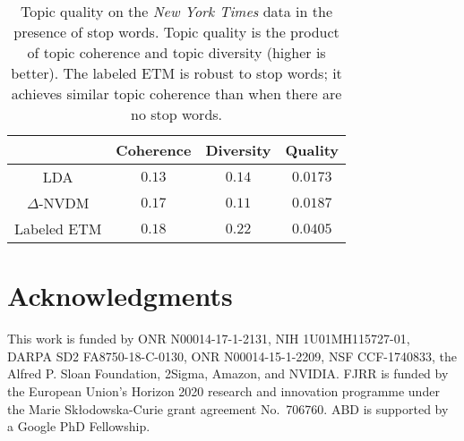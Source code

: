 \documentclass[11pt,a4paper]{article}
\begin{document}
\begin{table}[t]
  \centering
  \caption{Topic quality on the \emph{New York Times} data in the
    presence of stop words. Topic quality is the
    product of topic coherence and topic diversity (higher is
    better). The labeled \gls{ETM} is robust to stop words; it achieves
    similar topic coherence than when there are no stop words.
    \label{tab:tc_td_stopwords}}
  {\small
    \begin{tabular}{cccc} \toprule
      & Coherence  &  Diversity  & Quality\\ \midrule
      \acrshort{LDA}           &  $0.13$ & $0.14$ & $0.0173$  \\
            $\Delta$-\acrshort{NVDM} &   $0.17$        &    $0.11$   & $0.0187$    \\
      Labeled \acrshort{ETM}    & $\mathbf{0.18}$ & $\mathbf{0.22}$ & $\mathbf{0.0405}$\\ \bottomrule
    \end{tabular}}
\end{table}




 

\section*{Acknowledgments}
This work is funded by ONR N00014-17-1-2131, NIH 1U01MH115727-01, DARPA SD2 FA8750-18-C-0130, ONR N00014-15-1-2209, NSF CCF-1740833, the Alfred P. Sloan Foundation, 2Sigma, Amazon, and NVIDIA. FJRR is funded by the European Union's Horizon 2020 research and innovation programme under the Marie Sk\l{}odowska-Curie grant agreement No.\ 706760. 
ABD is supported by a Google PhD Fellowship.



\end{document}
